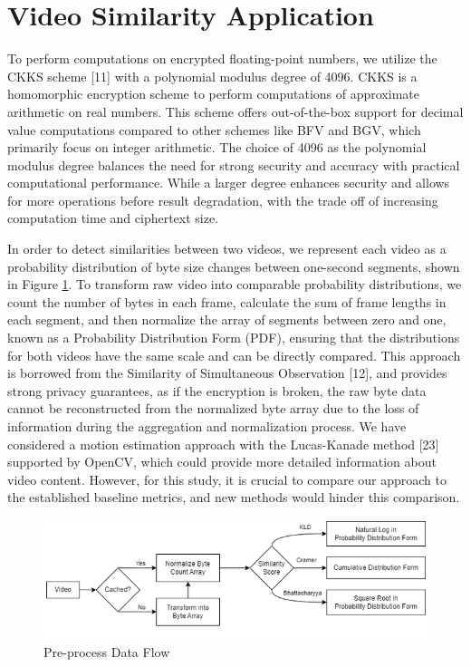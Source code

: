 \section{Video Similarity Application}
To perform computations on encrypted floating-point numbers, we utilize the CKKS scheme [11] with a polynomial modulus degree of 4096. CKKS is a homomorphic encryption scheme to perform computations of approximate arithmetic on real numbers. This scheme offers out-of-the-box support for decimal value computations compared to other schemes like BFV and BGV, which primarily focus on integer arithmetic. The choice of 4096 as the polynomial modulus degree balances the need for strong security and accuracy with practical computational performance. While a larger degree enhances security and allows for more operations before result degradation, with the trade off of increasing computation time and ciphertext size.

In order to detect similarities between two videos, we represent each video as a probability distribution of byte size changes between one-second segments, shown in Figure \ref{fig:preprocess-data-flow}. To transform raw video into comparable probability distributions, we count the number of bytes in each frame, calculate the sum of frame lengths in each segment, and then normalize the array of segments between zero and one, known as a Probability Distribution Form (PDF), ensuring that the distributions for both videos have the same scale and can be directly compared. This approach is borrowed from the Similarity of Simultaneous Observation [12], and provides strong privacy guarantees, as if the encryption is broken, the raw byte data cannot be reconstructed from the normalized byte array due to the loss of information during the aggregation and normalization process. We have considered a motion estimation approach with the Lucas-Kanade method [23] supported by OpenCV, which could provide more detailed information about video content. However, for this study, it is crucial to compare our approach to the established baseline metrics, and new methods would hinder this comparison.

\begin{figure}[ht]
    \centering
    \includegraphics[width=\textwidth]{4 Design/4.3 Preprocess Data Flow.png}
    \caption{Pre-process Data Flow}
    \label{fig:preprocess-data-flow}
\end{figure}

